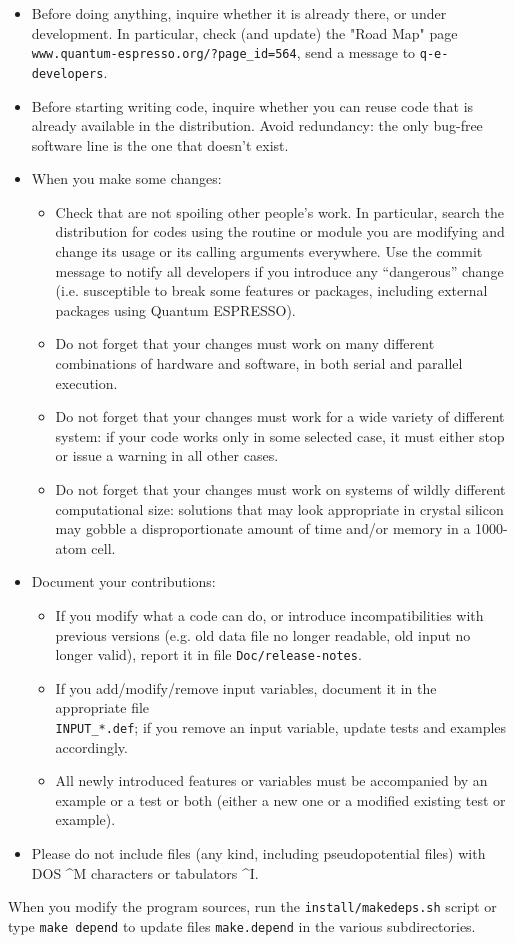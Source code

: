 \documentclass[12pt,a4paper]{article}
\def\qe{{\sc Quantum ESPRESSO}}
\begin{document}
\begin{itemize}
\item Before doing anything, inquire whether it is already there,
or under development. In particular, check (and update) the "Road Map"
page \texttt{www.quantum-espresso.org/?page\_id=564}, send a message to
\texttt{q-e-developers}.
\item Before starting writing code, inquire whether you can reuse
code that is already available in the distribution. Avoid redundancy: 
the only bug-free software line is the one that doesn't exist.
\item When you make some changes:
\begin{itemize}
\item Check that are not spoiling other people's work. In particular, 
search the distribution for codes using the routine or module you are 
modifying and change its usage or its calling arguments everywhere.
Use the commit message to notify all developers if you introduce any 
``dangerous'' change (i.e. susceptible to break some features or 
packages, including external packages using \qe).
\item Do not forget that your changes must work on many different 
combinations of hardware and software, in both serial and parallel execution.
\item Do not forget that your changes must work for a wide variety of
different system: if your code works only in some selected case, it
must either stop or issue a warning in all other cases.
\item Do not forget that your changes must work on systems of wildly
different computational size: solutions that may look appropriate in
crystal silicon may gobble a disproportionate amount of time and/or
memory in a 1000-atom cell.
\end{itemize}
\item Document your contributions:
\begin{itemize}
\item If you modify what a code can do, or introduce
incompatibilities with previous versions (e.g. old data file 
no longer readable, old input no longer valid), report it in
file \texttt{Doc/release-notes}.
\item If you add/modify/remove input variables, document
it in the appropriate file \\
\texttt{INPUT\_*.def}; if
you remove an input variable, update tests and examples
accordingly.
\item All newly introduced features or variables must be 
accompanied by an example or a test or both (either a 
new one or a modified existing test or example).
\end{itemize}
\item Please do not include files (any kind, including
pseudopotential files) with DOS \^{}M characters or 
tabulators \^{}I. 
\end{itemize}
When you modify the program sources, run the
\texttt{install/makedeps.sh}  script  or type \texttt{make depend} 
to update files \texttt{make.depend} in the various 
subdirectories.
\end{document}
